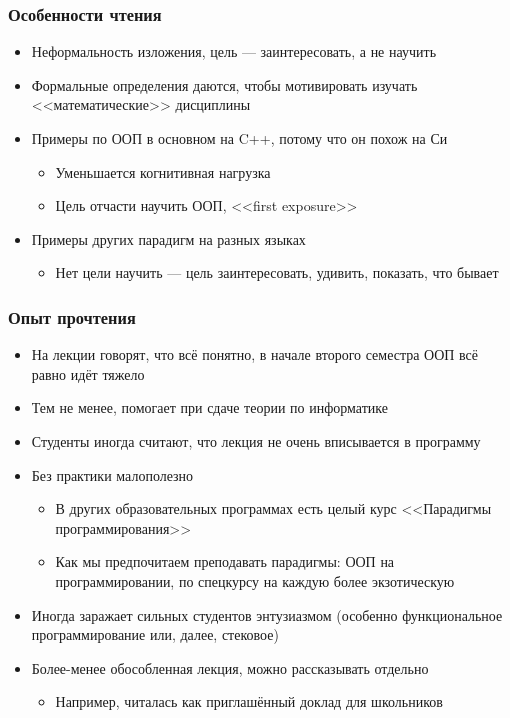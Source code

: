 \documentclass[xetex,mathserif,serif]{beamer}
\begin{document}
    \begin{frame}
        \frametitle{Особенности чтения}
        \begin{itemize}
            \item Неформальность изложения, цель --- заинтересовать, а не научить
            \item Формальные определения даются, чтобы мотивировать изучать <<математические>> дисциплины
            \item Примеры по ООП в основном на C++, потому что он похож на Си
            \begin{itemize}
                \item Уменьшается когнитивная нагрузка
                \item Цель отчасти научить ООП, <<first exposure>>
            \end{itemize}
            \item Примеры других парадигм на разных языках
            \begin{itemize}
                \item Нет цели научить --- цель заинтересовать, удивить, показать, что бывает
            \end{itemize}
        \end{itemize}
    \end{frame}

    \begin{frame}
        \frametitle{Опыт прочтения}
        \begin{itemize}
            \item На лекции говорят, что всё понятно, в начале второго семестра ООП всё равно идёт тяжело
            \item Тем не менее, помогает при сдаче теории по информатике
            \item Студенты иногда считают, что лекция не очень вписывается в программу
            \item Без практики малополезно
            \begin{itemize}
                \item В других образовательных программах есть целый курс <<Парадигмы программирования>>
                \item Как мы предпочитаем преподавать парадигмы: ООП на программировании, по спецкурсу на каждую более экзотическую
            \end{itemize}
            \item Иногда заражает сильных студентов энтузиазмом (особенно функциональное программирование или, далее, стековое)
            \item Более-менее обособленная лекция, можно рассказывать отдельно
            \begin{itemize}
                \item Например, читалась как приглашённый доклад для школьников
            \end{itemize}
        \end{itemize}
    \end{frame}
    
\end{document}
